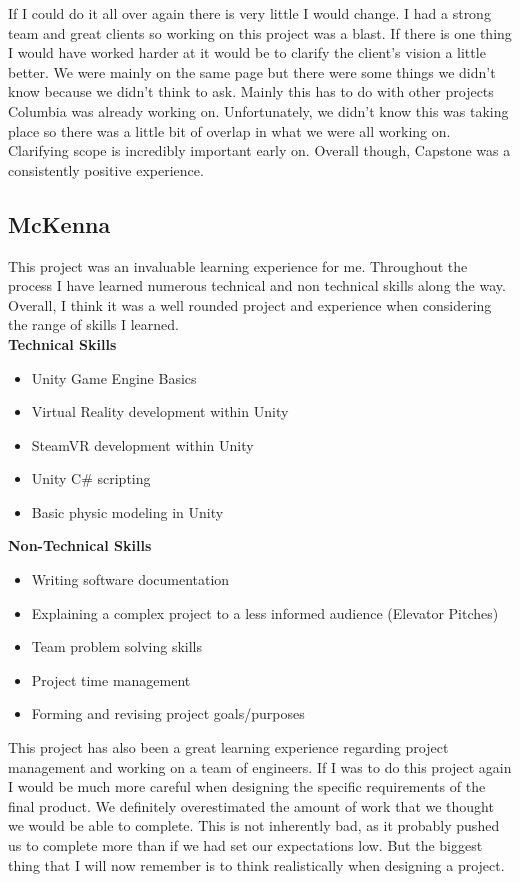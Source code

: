 \documentclass[10pt,journal,compsoc,onecolumn, draftclsnofoot]{IEEEtran}
\begin{document}
If I could do it all over again there is very little I would change. I had a strong team and great clients so working on this project was a blast. If there is one thing I would have worked harder at it would be to clarify the client’s vision a little better. We were mainly on the same page but there were some things we didn’t know because we didn’t think to ask. Mainly this has to do with other projects Columbia was already working on. Unfortunately, we didn’t know this was taking place so there was a little bit of overlap in what we were all working on. Clarifying scope is incredibly important early on. Overall though, Capstone was a consistently positive experience.


\subsection{McKenna}
This project was an invaluable learning experience for me. Throughout the process I have learned numerous technical and non technical skills along the way. Overall, I think it was a well rounded project and experience when considering the range of skills I learned. \\

\textbf{Technical Skills}
\begin{itemize}
	\item Unity Game Engine Basics
	\item Virtual Reality development within Unity
	\item SteamVR development within Unity
	\item Unity C\# scripting
	\item Basic physic modeling in Unity
\end{itemize}

\textbf{Non-Technical Skills}
\begin{itemize}
	\item Writing software documentation
	\item Explaining a complex project to a less informed audience (Elevator Pitches)
	\item Team problem solving skills
	\item Project time management
	\item Forming and revising project goals/purposes \\
\end{itemize}

This project has also been a great learning experience regarding project management and working on a team of engineers. If I was to do this project again I would be much more careful when designing the specific requirements of the final product. We definitely overestimated the amount of work that we thought we would be able to complete. This is not inherently bad, as it probably pushed us to complete more than if we had set our expectations low. But the biggest thing that I will now remember is to think realistically when designing a project.
\end{document}
